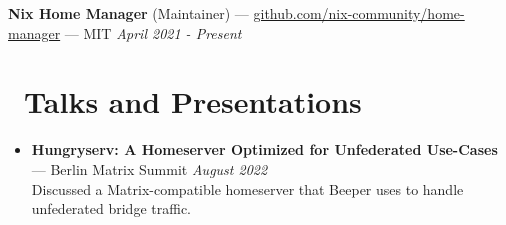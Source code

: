 \documentclass[10pt,letterpaper]{article}
\begin{document}
\textbf{Nix Home Manager} (Maintainer) ---
\href{https://github.com/nix-community/home-manager}{github.com/nix-community/home-manager}
--- MIT \hfill \textit{April 2021 - Present}


\section*{\faUsers\ Talks and Presentations}
\begin{itemize}
    \item \textbf{Hungryserv: A Homeserver Optimized for Unfederated Use-Cases}
        --- Berlin Matrix Summit
        \hfill \textit{August 2022} \\
        Discussed a Matrix-compatible homeserver that Beeper uses to handle
        unfederated bridge traffic.
\end{itemize}
\end{document}
